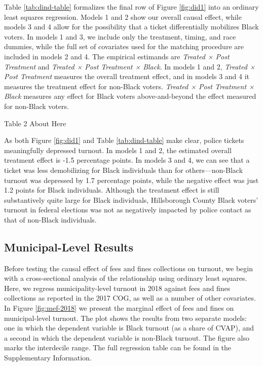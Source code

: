 \documentclass[
  12pt,
]{article}
\begin{document}
Table \ref{tab:dind-table} formalizes the final row of Figure \ref{fig:did1} into an ordinary least squares regression. Models 1 and 2 show our overall causal effect, while models 3 and 4 allow for the possibility that a ticket differentially mobilizes Black voters. In models 1 and 3, we include only the treatment, timing, and race dummies, while the full set of covariates used for the matching procedure are included in models 2 and 4. The empirical estimands are \emph{Treated × Post Treatment} and \emph{Treated × Post Treatment × Black}. In models 1 and 2, \emph{Treated × Post Treatment} measures the overall treatment effect, and in models 3 and 4 it measures the treatment effect for non-Black voters. \emph{Treated × Post Treatment × Black} measures any effect for Black voters above-and-beyond the effect measured for non-Black voters.

Table 2 About Here

As both Figure \ref{fig:did1} and Table \ref{tab:dind-table} make clear, police tickets meaningfully depressed turnout. In models 1 and 2, the estimated overall treatment effect is -1.5 percentage points. In models 3 and 4, we can see that a ticket was less demobilizing for Black individuals than for others---non-Black turnout was depressed by 1.7 percentage points, while the negative effect was just 1.2 points for Black individuals. Although the treatment effect is still substantively quite large for Black individuals, Hillsborough County Black voters' turnout in federal elections was not as negatively impacted by police contact as that of non-Black individuals.

\hypertarget{municipal-level-results}{%
\subsection*{Municipal-Level Results}\label{municipal-level-results}}

Before testing the causal effect of fees and fines collections on turnout, we begin with a cross-sectional analysis of the relationship using ordinary least squares. Here, we regress municipality-level turnout in 2018 against fees and fines collections as reported in the 2017 COG, as well as a number of other covariates. In Figure \ref{fig:mef-2018} we present the marginal effect of fees and fines on municipal-level turnout. The plot shows the results from two separate models: one in which the dependent variable is Black turnout (as a share of CVAP), and a second in which the dependent variable is non-Black turnout. The figure also marks the interdecile range. The full regression table can be found in the Supplementary Information.
\end{document}
